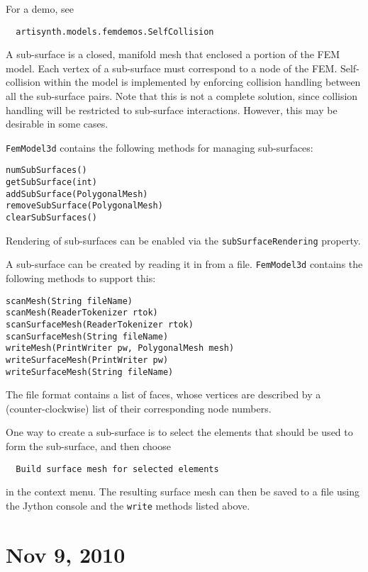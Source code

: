 \documentclass{article}
\begin{document}
For a demo, see 

\begin{verbatim}
  artisynth.models.femdemos.SelfCollision
\end{verbatim}

A sub-surface is a closed, manifold mesh that enclosed a portion of
the FEM model. Each vertex of a sub-surface must correspond to a node
of the FEM. Self-collision within the model is implemented by
enforcing collision handling between all the sub-surface pairs.  Note
that this is not a complete solution, since collision handling will be
restricted to sub-surface interactions. However, this may be desirable
in some cases.

{\tt FemModel3d} contains the following methods for managing sub-surfaces:

\begin{lstlisting}
numSubSurfaces()
getSubSurface(int)
addSubSurface(PolygonalMesh)
removeSubSurface(PolygonalMesh)
clearSubSurfaces()
\end{lstlisting}

Rendering of sub-surfaces can be enabled via the
{\tt subSurfaceRendering} property.

A sub-surface can be created by reading it in from a file. {\tt FemModel3d}
contains the following methods to support this:

\begin{lstlisting}
scanMesh(String fileName)
scanMesh(ReaderTokenizer rtok)
scanSurfaceMesh(ReaderTokenizer rtok)
scanSurfaceMesh(String fileName)
writeMesh(PrintWriter pw, PolygonalMesh mesh)
writeSurfaceMesh(PrintWriter pw)
writeSurfaceMesh(String fileName)
\end{lstlisting}

The file format contains a list of faces, whose vertices are described
by a (counter-clockwise) list of their corresponding node numbers.

One way to create a sub-surface is to select the elements that should
be used to form the sub-surface, and then choose

\begin{verbatim}
  Build surface mesh for selected elements
\end{verbatim}

in the context menu. The resulting surface mesh can then be saved to a
file using the Jython console and the {\tt write} methods listed above.

\section*{Nov 9, 2010}
\end{document}
